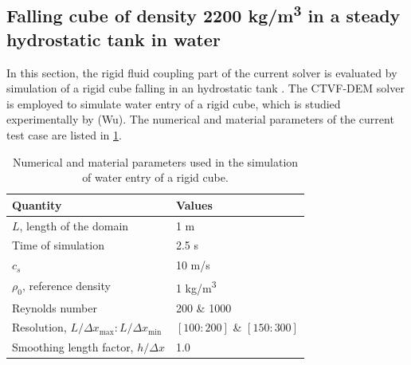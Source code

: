\subsection{Falling cube of density 2200 kg/m\textsuperscript{3} in a steady
  hydrostatic tank in water}
\label{sec:falling-solid-in-water}
In this section, the rigid fluid coupling part of the current solver is
evaluated by simulation of a rigid cube falling in an hydrostatic tank
\citep{qiu_3d_2017}. The CTVF-DEM solver is employed to simulate water entry of
a rigid cube, which is studied experimentally by (Wu). The numerical and
material parameters of the current test case are listed in
\cref{tab:rfc:qiu-falling-cube}.
\begin{table}[!ht]
  \centering
  \begin{tabular}[!ht]{ll}
    \toprule
    Quantity & Values\\
    \midrule
    $L$, length of the domain & 1 m \\
    Time of simulation & 2.5 s \\
    $c_s$ & 10 m/s \\
    $\rho_0$, reference density & 1 kg/m\textsuperscript{3} \\
    Reynolds number & 200 \& 1000 \\
    Resolution, $L/\Delta x_{\max} : L/\Delta x_{\min}$ & $[100:200]$ \& $[150:300]$\\
    Smoothing length factor, $h/\Delta x$ & 1.0\\
    \bottomrule
  \end{tabular}
  \caption{Numerical and material parameters used in the simulation of water
    entry of a rigid cube.}%
  \label{tab:rfc:qiu-falling-cube}
\end{table}

